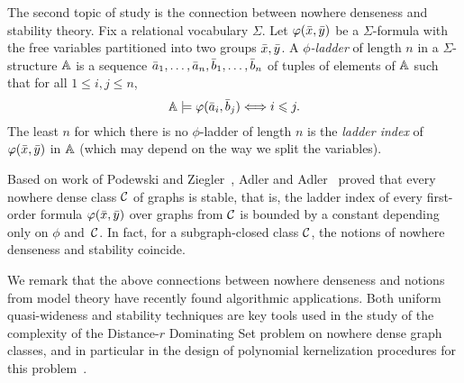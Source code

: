 The second topic of study is the
connection between nowhere denseness and stability theory. 
Fix
 a relational vocabulary $\Sigma$. Let 
$\varphi(\bar{x},\bar{y})$ be a $\Sigma$-formula with the free variables
partitioned into two groups $\bar{x}, \bar{y}$. A \emph{$\phi$-ladder}
of length $n$ in a $\Sigma$-structure $\mathbb A$ is a sequence $\bar{a}_1,\ldots, \bar{a}_{n},
\bar{b}_1,\ldots, \bar{b}_{n}$ of tuples of elements of $\mathbb A$ 
such that for all $1\leq i,j\le n$,
\[\mathbb{A}\models\varphi(\bar{a}_i,\bar{b}_j)\Longleftrightarrow i\leqslant j. \]
The least  $n$ for which 
there is no $\phi$-ladder of length $n$ is 
the \emph{ladder index} 
of $\varphi(\bar{x},\bar{y})$ in $\mathbb A$ (which may depend on the way we split the
variables). 

Based on work of Podewski and Ziegler~\cite{podewski1978stable}, 
Adler and Adler~\cite{adler2014interpreting}
proved that every nowhere dense class $\mathcal{C}$ of graphs is stable, that is, 
the ladder index of every first-order formula $\varphi(\bar{x},\bar{y})$ over
graphs from $\mathcal{C}$ is bounded by a constant depending only on $\phi$ 
and~$\mathcal{C}$. In fact, for a subgraph-closed class $\mathcal{C}$, the notions of nowhere denseness and stability coincide.

We remark that the above connections between nowhere denseness and notions from model theory have recently found algorithmic applications.
Both uniform quasi-wideness and stability techniques are key tools used in the study of the complexity of the {\sc Distance-$r$ Dominating Set} problem on nowhere dense graph classes,
and in particular in the design of polynomial kernelization procedures for this problem~\cite{DawarK09,drange2016kernelization,eickmeyer2016neighborhood,siebertz2016polynomial}.



